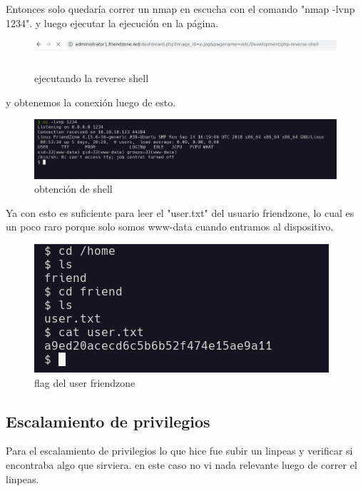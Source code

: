 \documentclass{article}
\begin{document}
Entonces solo quedaría correr un nmap en escucha con el comando "nmap -lvnp 1234".
y luego ejecutar la ejecución en la página.

\begin{figure}[H]
	\center
	\includegraphics[width=\textwidth]{images/friendzone/ejecucion-reverse.png}
	\caption{ejecutando la reverse shell}
\end{figure}

y obtenemos la conexión luego de esto.

\begin{figure}[H]
	\center
	\includegraphics[width=\textwidth]{images/friendzone/shell-obtenida.png}
	\caption{obtención de shell}
\end{figure}

Ya con esto es suficiente para leer el "user.txt" del usuario friendzone, lo cual es un poco raro porque solo somos www-data cuando entramos al dispositivo.

\begin{figure}[H]
	\center
	\includegraphics[width=\textwidth]{images/friendzone/flag-user.png}
	\caption{flag del user friendzone}
\end{figure}


\subsection{Escalamiento de privilegios}

Para el escalamiento de privilegios lo que hice fue subir un linpeas y verificar si encontraba algo que sirviera.
en este caso no vi nada relevante luego de correr el linpeas.
\end{document}
